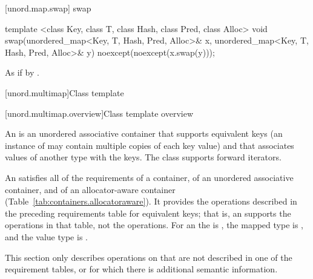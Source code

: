 [unord.map.swap]{ swap}

%
\begin{itemdecl}
template <class Key, class T, class Hash, class Pred, class Alloc>
  void swap(unordered_map<Key, T, Hash, Pred, Alloc>& x,
            unordered_map<Key, T, Hash, Pred, Alloc>& y)
    noexcept(noexcept(x.swap(y)));
\end{itemdecl}

\begin{itemdescr}
\pnum\effects As if by .
\end{itemdescr}

[unord.multimap]{Class template }%

[unord.multimap.overview]{Class template  overview}

\pnum
{}%
%
An  is an unordered associative container
that supports equivalent keys (an instance of  may contain
multiple copies of each key value) and that associates values of
another type  with the keys.
The  class
supports forward iterators.

\pnum
An  satisfies all of the requirements of a container, of an
unordered associative container, and of an allocator-aware container
(Table~\ref{tab:containers.allocatoraware}). It provides the operations described in the
preceding requirements table for equivalent keys; that is, an 
supports the  operations in that table, not the  operations.
For an  the  is , the
mapped type is , and the value type is .

\pnum
This section only describes operations on 
that are not described in one of the requirement tables, or for which
there is additional semantic information.

